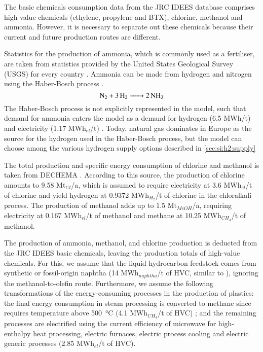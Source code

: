 The basic chemicals consumption data from the JRC IDEES \cite{IDEES} database
comprises high-value chemicals (ethylene, propylene and BTX), chlorine, methanol
and ammonia. However, it is necessary to separate out these chemicals because
their current and future production routes are different.

Statistics for the production of ammonia, which is commonly used as a
fertiliser, are taken from statistics provided by the United States Geological
Survey (USGS) for every country \citeS{}. Ammonia can be made from hydrogen and
nitrogen using the Haber-Bosch process .
\begin{equation}
    \ce{N2 + 3H2 -> 2NH3}
\end{equation}
The Haber-Bosch process is not explicitly represented in the model, such that
demand for ammonia enters the model as a demand for hydrogen (6.5
MWh/t) and electricity (1.17 MWh$_{el}$/t)
. Today, natural gas dominates in Europe as the source for
the hydrogen used in the Haber-Bosch process, but the model can choose among the
various hydrogen supply options described in
\cref{sec:si:h2:supply}

The total production and specific energy consumption of chlorine and methanol is
taken from DECHEMA . According to this
source, the production of chlorine amounts to 9.58 Mt$_{Cl}$/a, which is assumed
to require electricity at 3.6 MWh$_{el}$/t of chlorine and yield hydrogen at
0.9372 MWh$_{H_2}$/t of chlorine in the chloralkali process. The production of
methanol adds up to 1.5 Mt$_{MeOH}$/a, requiring electricity at 0.167 MWh$_{el}$/t
of methanol and methane at 10.25 MWh$_{CH_4}$/t of methanol.

The production of ammonia, methanol, and chlorine production is deducted from
the JRC IDEES basic chemicals, leaving the production totals of high-value
chemicals. For this, we assume that the liquid hydrocarbon feedstock comes from
synthetic or fossil-origin naphtha (14 MWh$_{naphtha}$/t of HVC, similar to
), ignoring the methanol-to-olefin
route. Furthermore, we assume the following transformations of the
energy-consuming processes in the production of plastics: the final energy
consumption in steam processing is converted to methane since requires
temperature above \SI{500}{\celsius} (4.1 MWh$_{CH_4}$/t of HVC)
; and the remaining processes are
electrified using the current efficiency of microwave for high-enthalpy heat
processing, electric furnaces, electric process cooling and electric generic
processes (2.85 MWh$_{el}$/t of HVC).


